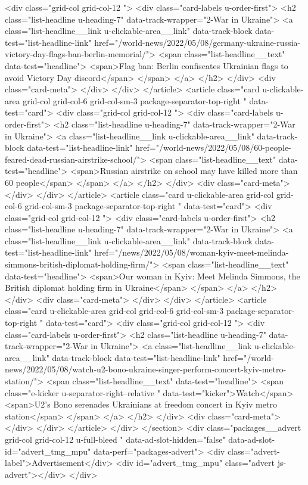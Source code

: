 {{{<div class="grid-col grid-col-12  ">
<div class="card-labels u-order-first">
<h2 class="list-headline  u-heading-7" data-track-wrapper="2-War in Ukraine">
<a class="list-headline__link u-clickable-area__link" data-track-block data-test="list-headline-link" href="/world-news/2022/05/08/germany-ukraine-russia-victory-day-flags-ban-berlin-memorial/">
<span class="list-headline__text" data-test="headline">
<span>Flag ban: Berlin confiscates Ukrainian flags to avoid Victory Day discord</span>
</span>
</a>
</h2>
</div>
<div class="card-meta">
</div>
</div>
</article>
<article class="card u-clickable-area grid-col grid-col-6 grid-col-sm-3 package-separator-top-right " data-test="card">
<div class="grid-col grid-col-12  ">
<div class="card-labels u-order-first">
<h2 class="list-headline  u-heading-7" data-track-wrapper="2-War in Ukraine">
<a class="list-headline__link u-clickable-area__link" data-track-block data-test="list-headline-link" href="/world-news/2022/05/08/60-people-feared-dead-russian-airstrike-school/">
<span class="list-headline__text" data-test="headline">
<span>Russian airstrike on school may have killed more than 60 people</span>
</span>
</a>
</h2>
</div>
<div class="card-meta">
</div>
</div>
</article>
<article class="card u-clickable-area grid-col grid-col-6 grid-col-sm-3 package-separator-top-right " data-test="card">
<div class="grid-col grid-col-12  ">
<div class="card-labels u-order-first">
<h2 class="list-headline  u-heading-7" data-track-wrapper="2-War in Ukraine">
<a class="list-headline__link u-clickable-area__link" data-track-block data-test="list-headline-link" href="/news/2022/05/08/woman-kyiv-meet-melinda-simmons-british-diplomat-holding-firm/">
<span class="list-headline__text" data-test="headline">
<span>Our woman in Kyiv: Meet Melinda Simmons, the British diplomat holding firm in Ukraine</span>
</span>
</a>
</h2>
</div>
<div class="card-meta">
</div>
</div>
</article>
<article class="card u-clickable-area grid-col grid-col-6 grid-col-sm-3 package-separator-top-right " data-test="card">
<div class="grid-col grid-col-12  ">
<div class="card-labels u-order-first">
<h2 class="list-headline  u-heading-7" data-track-wrapper="2-War in Ukraine">
<a class="list-headline__link u-clickable-area__link" data-track-block data-test="list-headline-link" href="/world-news/2022/05/08/watch-u2-bono-ukraine-singer-perform-concert-kyiv-metro-station/">
<span class="list-headline__text" data-test="headline">
<span class="e-kicker u-separator-right--relative " data-test="kicker">Watch</span>
<span>U2’s Bono serenades Ukrainians at freedom concert in Kyiv metro station</span>
</span>
</a>
</h2>
</div>
<div class="card-meta">
</div>
</div>
</article>
</div>
</section>
<div class="packages__advert grid-col grid-col-12 u-full-bleed " data-ad-slot-hidden="false" data-ad-slot-id="advert_tmg_mpu" data-perf="packages-advert">
<div class="advert-label">Advertisement</div>
<div id="advert_tmg_mpu" class="advert js-advert"></div>
</div>

}}}
